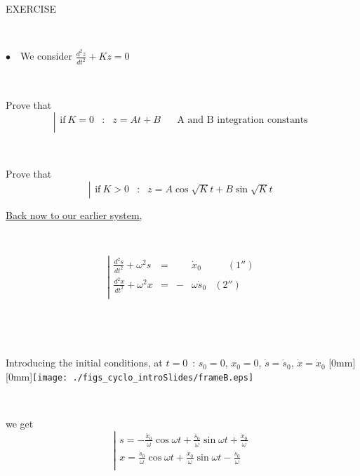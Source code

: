 \documentclass[12pt]{paper}
\newcommand{\nib}{\noindent $\bullet$~}
\newcommand{\nin}{\noindent}
\newcommand{\blue}{\color{blue}}
\begin{document}
\clearpage 

{\blue 
EXERCISE     \label{EX9}

~

\nib\ We consider  $\frac{\textstyle{d^2z}}{\textstyle{dt^2}} + K z   = 0$

~

Prove that 
$$\left| 
\begin{array}{lclr} 
\textrm{if} ~ K  = 0 & : & z = A t + B  & ~ ~ ~ ~ \textrm{A and B integration constants}       \\
\end{array} 
\right.$$

~

Prove that 
$$\left| 
\begin{array}{lcl} 
\textrm{if} ~ K  > 0 & : & z = A \cos\sqrt{K} t  + B \sin\sqrt{K} t   
\end{array} 
\right.$$
}





\clearpage

\nin \underline{Back now to our earlier system, }


~

$$\left| 
\begin{array}{lcclrcccrccr} 
  \frac{\textstyle{d^2s}}{\textstyle{dt^2}} + \omega^2 s &=&  & \dot x_0 & ~ ~ ~ ~ ~ ~   (1'')\\
  \frac{\textstyle{d^2x}}{\textstyle{dt^2}}  +  \omega^2 x &=& -& \omega \dot s_0  &  (2'')\\
\end{array} 
\right.$$

~

~

Introducing the initial conditions, at $t=0$~:  $s_0=0$, $x_0=0$, $\dot s = \dot s_0$, $\dot x = \dot x_0$
   \hfill \raisebox{-40mm}[0mm][0mm]{\texttt{[image: ./figs\_cyclo\_introSlides/frameB.eps]}}

~

we get 
$$\left| 
\begin{array}{l} 
 s = -\frac{\textstyle{\dot x_0}}{\textstyle{\omega}} \cos\omega t + \frac{\textstyle{\dot s_0}}{\textstyle{\omega}}  \sin\omega t 
+ \frac{\textstyle{\dot x_0}}{\textstyle{\omega}} \\
 x = \frac{\textstyle{\dot s_0}}{\textstyle{\omega}} \cos\omega t  + \frac{\textstyle{\dot x_0}}{\textstyle{\omega}}  \sin\omega t 
- \frac{\textstyle{\dot s_0}}{\textstyle{\omega}}\\
\end{array} 
\right.$$
\end{document}
